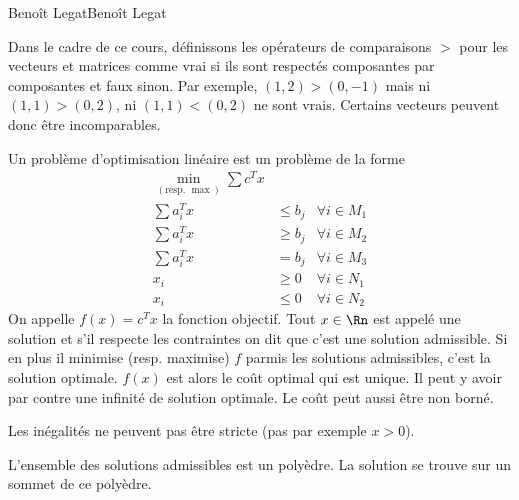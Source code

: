 

{Benoît Legat}{Benoît Legat}

\newcommand{\libre}{\ensuremath{\textrm{ libre}}}
\newcommand{\redcost}{\tilde{c}} %
\newcommand{\xopt}{\ensuremath{x^*}}


\begin{mydef}
  Dans le cadre de ce cours, définissons les opérateurs de comparaisons $>$
  pour les vecteurs et matrices comme vrai si ils sont respectés composantes
  par composantes et faux sinon.
  Par exemple, $(1, 2) > (0, -1)$ mais ni $(1, 1) > (0, 2)$,
  ni $(1, 1) < (0, 2)$ ne sont vrais.
  Certains vecteurs peuvent donc être incomparables.
\end{mydef}

\begin{mydef}
  Un problème d'optimisation linéaire est un problème de la forme
  \begin{align*}
    \min_{(\text{resp. }\max)} \sum c^T x\\
    \sum a_i^T x & \leq b_j & \forall i \in M_1\\
    \sum a_i^T x & \geq b_j & \forall i \in M_2\\
    \sum a_i^T x & = b_j & \forall i \in M_3\\
    x_i & \geq 0 & \forall i \in N_1\\
    x_i & \leq 0 & \forall i \in N_2
  \end{align*}
  On appelle $f(x) = c^Tx$ la fonction objectif.
  Tout $x \in \Rn$ est appelé une solution et s'il respecte les contraintes
  on dit que c'est une solution admissible.
  Si en plus il minimise (resp. maximise) $f$ parmis les solutions admissibles,
  c'est la solution optimale.
  $f(x)$ est alors le coût optimal qui est unique.
  Il peut y avoir par contre une infinité de solution optimale.
  Le coût peut aussi être non borné.
\end{mydef}

\begin{myrem}
  Les inégalités ne peuvent pas être stricte (pas par exemple $x > 0$).
\end{myrem}
\begin{myrem}
  L'ensemble des solutions admissibles est un polyèdre.
  La solution se trouve sur un sommet de ce polyèdre.
\end{myrem}

